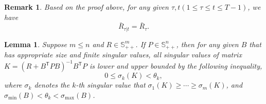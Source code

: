 \documentclass[letterpaper, 10 pt, conference]{ieeeconf}  %
\newcommand{\transpose}{\mathsf{T}}
\newtheorem{lemma}{Lemma}
\newtheorem{remark}{Remark}
\begin{document}
\begin{remark}
    Based on the proof above, for any given $\tau,t(1\leq \tau \leq t \leq T-1)$, we have
    \begin{equation*}
        \bar{R}_{\tau|t} = \bar{R}_{\tau}.
    \end{equation*}
\end{remark}

\begin{lemma}\label{lemma:matrixK}
    Suppose $m \leq n$ and $R\in \mathbb{S}^{m}_{++}$. 
    If $P\in \mathbb{S}^{n}_{++}$, then for any given $B$ that has appropriate size and finite singular values, all singular values of matrix $K = (R+B^{\transpose}PB)^{-1}B^{\transpose}P$ is lower and upper bounded by the following inequality,
    \begin{equation}
        0 \leq \sigma_{k}(K) < \theta_{k},
    \end{equation}
    where $\sigma_{k}$ denotes the $k$-th singular value that $\sigma_{1}(K) \geq \cdots \geq \sigma_{m}(K)$, and $\sigma_{\min}(B) < \theta_{k} <\sigma_{\max}(B)$.
\end{lemma}
\end{document}
